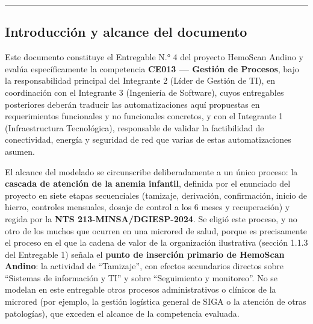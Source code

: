 \documentclass[11pt,a4paper]{article}
\begin{document}
\begin{center}\rule{0.5\linewidth}{0.5pt}\end{center}

\subsection{Introducción y alcance del documento}\label{introducciuxf3n-y-alcance-del-documento}

Este documento constituye el Entregable N.° 4 del proyecto HemoScan Andino y evalúa específicamente la competencia \textbf{CE013 --- Gestión de Procesos}, bajo la responsabilidad principal del Integrante 2 (Líder de Gestión de TI), en coordinación con el Integrante 3 (Ingeniería de Software), cuyos entregables posteriores deberán traducir las automatizaciones aquí propuestas en requerimientos funcionales y no funcionales concretos, y con el Integrante 1 (Infraestructura Tecnológica), responsable de validar la factibilidad de conectividad, energía y seguridad de red que varias de estas automatizaciones asumen.

El alcance del modelado se circunscribe deliberadamente a un único proceso: la \textbf{cascada de atención de la anemia infantil}, definida por el enunciado del proyecto en siete etapas secuenciales (tamizaje, derivación, confirmación, inicio de hierro, controles mensuales, dosaje de control a los 6 meses y recuperación) y regida por la \textbf{NTS 213-MINSA/DGIESP-2024}. Se eligió este proceso, y no otro de los muchos que ocurren en una microred de salud, porque es precisamente el proceso en el que la cadena de valor de la organización ilustrativa (sección 1.1.3 del Entregable 1) señala el \textbf{punto de inserción primario de HemoScan Andino}: la actividad de ``Tamizaje'', con efectos secundarios directos sobre ``Sistemas de información y TI'' y sobre ``Seguimiento y monitoreo''. No se modelan en este entregable otros procesos administrativos o clínicos de la microred (por ejemplo, la gestión logística general de SIGA o la atención de otras patologías), que exceden el alcance de la competencia evaluada.
\end{document}
